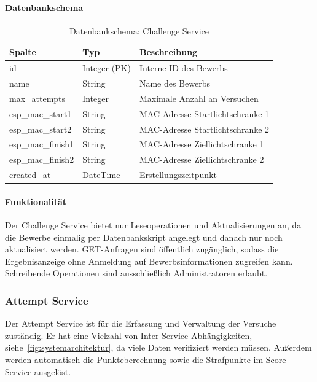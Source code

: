 \paragraph{Datenbankschema}
\begin{table}[h]
    \centering
    \begin{tabular}{|l|l|l|}
        \hline
        \textbf{Spalte} & \textbf{Typ} & \textbf{Beschreibung} \\
        \hline
        id & Integer (PK) & Interne ID des Bewerbs \\
        name & String & Name des Bewerbs \\
        max\_attempts & Integer & Maximale Anzahl an Versuchen \\
        esp\_mac\_start1 & String & MAC-Adresse Startlichtschranke 1 \\
        esp\_mac\_start2 & String & MAC-Adresse Startlichtschranke 2 \\
        esp\_mac\_finish1 & String & MAC-Adresse Ziellichtschranke 1 \\
        esp\_mac\_finish2 & String & MAC-Adresse Ziellichtschranke 2 \\
        created\_at & DateTime & Erstellungszeitpunkt \\
        \hline
    \end{tabular}
    \caption{Datenbankschema: Challenge Service}
    \label{tab:challenge_schema}
\end{table}

\paragraph{Funktionalität}
Der Challenge Service bietet nur Leseoperationen und Aktualisierungen an, da die Bewerbe einmalig 
per Datenbankskript angelegt und danach nur noch aktualisiert werden. GET-Anfragen sind öffentlich zugänglich, 
sodass die Ergebnisanzeige ohne Anmeldung auf Bewerbsinformationen zugreifen kann.
Schreibende Operationen sind ausschließlich Administratoren erlaubt.

\newpage

\subsubsection{Attempt Service}
\label{sec:attempt_service}
Der Attempt Service ist für die Erfassung und Verwaltung der Versuche zuständig.
Er hat eine Vielzahl von Inter-Service-Abhängigkeiten, siehe~\ref{fig:systemarchitektur}, da viele Daten verifiziert werden müssen. 
Außerdem werden automatisch die Punkteberechnung sowie die Strafpunkte im Score Service ausgelöst.

